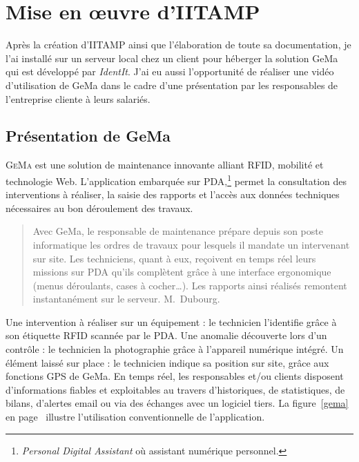 \chapter{Mise en \oe{}uvre d'IITAMP} %
\label{cha:Mise en oeuvre d'IITAMP}

\begin{it}
Après la création d'IITAMP ainsi que l'élaboration de toute sa
documentation, je l'ai installé sur un serveur local chez un client pour
héberger la solution GeMa qui est développé par \emph{IdentIt}. J'ai eu
aussi l'opportunité de réaliser une vidéo d'utilisation de GeMa dans le
cadre d'une présentation par les responsables de l'entreprise cliente à
leurs salariés.
\end{it}

\section{Présentation de GeMa} %
\label{sec:Présentation de GeMa}

\lettrine{G}{eMa} est une solution de maintenance innovante alliant
RFID, mobilité et technologie Web. L'application embarquée sur
PDA,\footnote{\emph{Personal Digital Assistant} où assistant numérique
personnel.} permet la consultation des interventions à réaliser, la
saisie des rapports et l'accès aux données techniques nécessaires au bon
déroulement des travaux.

\begin{quotation}
\og{}Avec GeMa, le responsable de maintenance prépare depuis son poste
informatique les ordres de travaux pour lesquels il mandate un
intervenant sur site. Les techniciens, quant à eux, reçoivent en temps
réel leurs missions sur PDA qu'ils complètent grâce à une interface
ergonomique (menus déroulants, cases à cocher\dots). Les rapports ainsi
réalisés remontent instantanément sur le serveur. \fg{} M.~Dubourg.
\end{quotation}

Une intervention à réaliser sur un équipement : le technicien
l'identifie grâce à son étiquette RFID scannée par le PDA. Une anomalie
découverte lors d'un contrôle : le technicien la photographie grâce à
l'appareil numérique intégré. Un élément laissé sur place : le
technicien indique sa position sur site, grâce aux fonctions GPS de
GeMa. En temps réel, les responsables et/ou clients disposent
d'informations fiables et exploitables au travers d'historiques, de
statistiques, de bilans, d'alertes email ou via des échanges avec un
logiciel tiers. La figure~\ref{gema} en page~\pageref{gema} illustre
l'utilisation conventionnelle de l'application.

